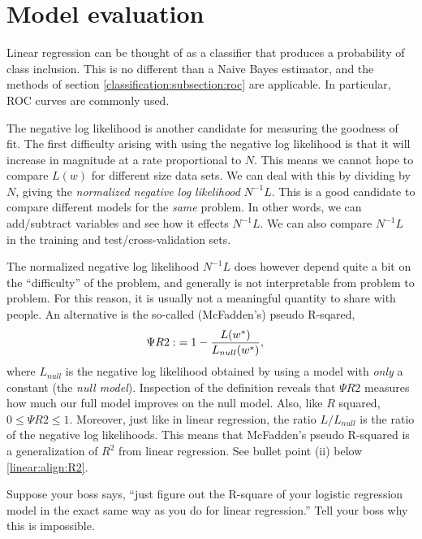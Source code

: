\section{Model evaluation}

Linear regression can be thought of as a classifier that produces a probability of class inclusion.  This is no different than a Naive Bayes estimator, and the methods of section \ref{classification:subsection:roc} are applicable.  In particular, ROC curves are commonly used.  

The negative log likelihood is another candidate for measuring the goodness of fit.  The first difficulty arising with using the negative log likelihood is that it will increase in magnitude at a rate proportional to $N$.  This means we cannot hope to compare $L(w)$ for different size data sets. We can deal with this by dividing by $N$, giving the \emph{normalized negative log likelihood} $N^{-1}L$.  This is a good candidate to compare different models for the \emph{same} problem.  In other words, we can add/subtract variables and see how it effects $N^{-1}L$.  We can also compare $N^{-1}L$ in the training and test/cross-validation sets.

The normalized negative log likelihood $N^{-1}L$ does however depend quite a bit on the ``difficulty'' of the problem, and generally is not interpretable from problem to problem.  For this reason, it is usually not a meaningful quantity to share with people.  An alternative is the so-called (McFadden's) pseudo R-sqared,
\begin{align*}
  \Psi R2 :&= 1 - \frac{L({w^\ast})}{L_{null}({w^\ast})},
\end{align*}
where $L_{null}$ is the negative log likelihood obtained by using a model with \emph{only} a constant (the \emph{null model}).  Inspection of the definition reveals that $\Psi R2$ measures how much our full model improves on the null model.  Also, like $R$ squared, $0\leq\Psi R2\leq 1$.  Moreover, just like in linear regression, the ratio $L/L_{null}$ is the ratio of the negative log likelihoods.  This means that McFadden's pseudo R-squared is a generalization of $R^2$ from linear regression.  See bullet point (ii) below \eqref{linear:align:R2}.

\begin{exercise}
  Suppose your boss says, ``just figure out the R-square of your logistic regression model in the exact same way as you do for linear regression.''  Tell your boss why this is impossible.
\end{exercise}

